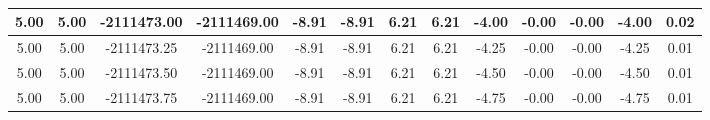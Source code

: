 \begin{table}[htbp]
\begin{adjustbox}{angle=90}
\begin{tabular}{|c|c|c|c|c|c|c|c|c|c|c|c|c|}
 5.00 & 5.00 & -2111473.00 & -2111469.00 & -8.91 & -8.91 & 6.21 & 6.21 & -4.00 & -0.00 & -0.00 & -4.00 & 0.02\\ \hline
 5.00 & 5.00 & -2111473.25 & -2111469.00 & -8.91 & -8.91 & 6.21 & 6.21 & -4.25 & -0.00 & -0.00 & -4.25 & 0.01\\ \hline
 5.00 & 5.00 & -2111473.50 & -2111469.00 & -8.91 & -8.91 & 6.21 & 6.21 & -4.50 & -0.00 & -0.00 & -4.50 & 0.01\\ \hline
 5.00 & 5.00 & -2111473.75 & -2111469.00 & -8.91 & -8.91 & 6.21 & 6.21 & -4.75 & -0.00 & -0.00 & -4.75 & 0.01\\ \hline
            \end{tabular}
        \end{adjustbox}
        \caption{}
        \label{}
    \end{table}
    